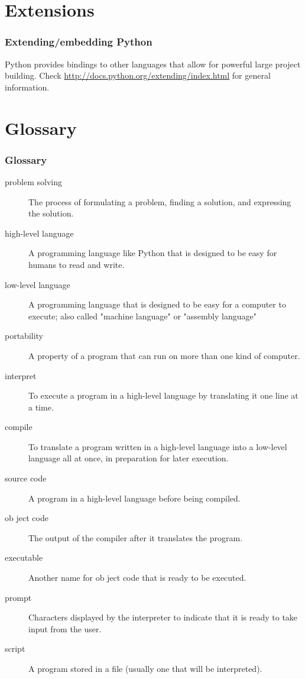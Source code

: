 \documentclass{beamer}
\begin{document}
\section{Extensions}

\begin{frame}

\frametitle{Extending/embedding Python}
Python provides bindings to other languages that allow for powerful large project building. Check
\url{http://docs.python.org/extending/index.html}
for general information.
\end{frame}

\section{Glossary}

\begin{frame}[allowframebreaks]
\frametitle{Glossary}
\tiny
\begin{description}
\item[problem solving] The process of formulating a problem, finding a solution, and expressing the solution. 
\item[high-level language] A programming language like Python that is designed to be easy for humans to read and write. 
\item[low-level language] A programming language that is designed to be easy for a computer to execute; also called "machine language" or "assembly language" 
\item[portability] A property of a program that can run on more than one kind of computer. 
\item[interpret] To execute a program in a high-level language by translating it one line at a time. 
\item[compile] To translate a program written in a high-level language into a low-level language all at once, in preparation for later execution. 
\item[source code] A program in a high-level language before being compiled. 
\item[ob ject code] The output of the compiler after it translates the program. 
\item[executable] Another name for ob ject code that is ready to be executed. 
\item[prompt] Characters displayed by the interpreter to indicate that it is ready to take input from the user. 
\item[script] A program stored in a file (usually one that will be interpreted).

\end{description}
\end{frame}
\end{document}
